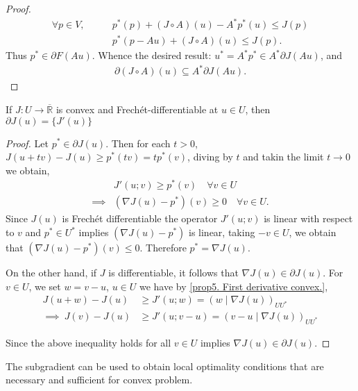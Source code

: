 \begin{theorem}
\begin{proof}
\begin{align*}
	\forall p \in V, \qquad &p^*(p)+(J\circ A)(u) - A^*p^*(u) \leq J(p) \\
	& p^*(p-Au) + (J\circ A)(u)\leq J(p).
\end{align*}
Thus $p^* \in \partial F(Au)$. Whence the desired result: $u^*= A^*p^* \in A^*\partial J (Au)$, and
\begin{align*}
	\partial (J\circ A)(u)\subseteq A^* \partial J(Au).
\end{align*}
\end{proof}
\end{theorem}

\begin{theorem}
	If $J: U\rightarrow \overline{\mathbb{R}}$ is convex and Frech\'et-differentiable at $u\in U$, then $\partial J(u)=\lbrace J'(u)\rbrace$
	
	\begin{proof}
		Let $p^* \in \partial J(u)$. Then for each $t>0$, $J(u+tv)-J(u)\geq p^*(tv)=tp^*(v)$, diving by $t$ and takin the limit $t\rightarrow 0$ we obtain,
		\begin{align*}
			&J'(u;v) \geq p^*(v) \quad \forall v \in U \\
	\implies& (\nabla J(u)-p^*)(v) \geq 0 \quad \forall v \in U.
		\end{align*}
	Since $J(u)$ is Frech\'et differentiable the operator $J'(u;v)$ is linear with respect to $v$ and $p^* \in U^*$ implies $(\nabla J(u)-p^*)$ is linear, taking $-v \in U$, we obtain that $(\nabla J(u)-p^*)(v)\leq 0$. Therefore $p^*=\nabla J(u)$.
	
	On the other hand, if $J$ is differentiable, it follows that $\nabla J(u)\in \partial J(u)$. For $v\in U$, we set $w=v-u$, $u\in U$ we have by \eqref{prop5. First derivative convex.}, 
	\begin{align*}
		    J(u+w)-J(u)&\geq J'(u;w)=\left(w\mid \nabla J(u)\right)_{UU^*} \\
	\implies \ J(v)-J(u)&\geq J'(u; v-u) = \left(v-u \mid \nabla J(u)\right)_{UU^*}
	\end{align*}
	
	Since the above inequality holds for all $v \in U$ implies $\nabla J(u) \in \partial J(u)$.
	\end{proof}
\end{theorem}
\begin{remark}
	The subgradient can be used to obtain local optimality conditions that are necessary and sufficient for convex problem.
\end{remark}
